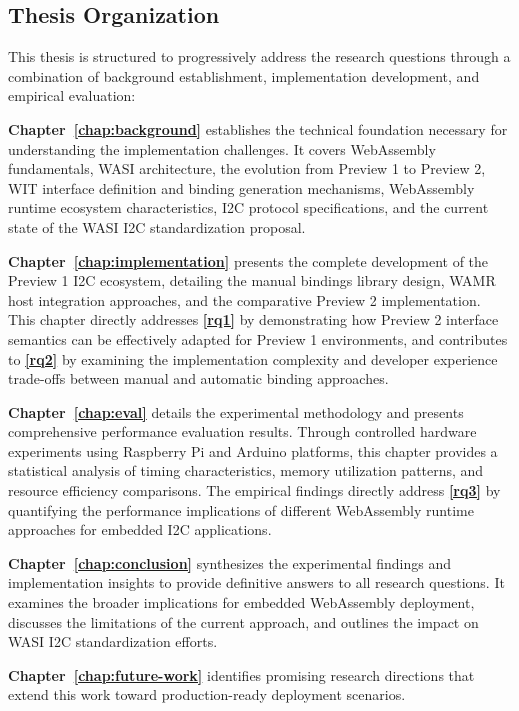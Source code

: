 \subsection{Thesis Organization}
\label{subsec:thesis-organization}

This thesis is structured to progressively address the research questions through a combination of background establishment, implementation development, and empirical evaluation:

\textbf{Chapter~\ref{chap:background}} establishes the technical foundation necessary for understanding the implementation challenges. It covers WebAssembly fundamentals, WASI architecture, the evolution from Preview 1 to Preview 2, WIT interface definition and binding generation mechanisms, WebAssembly runtime ecosystem characteristics, I2C protocol specifications, and the current state of the WASI I2C standardization proposal.

\textbf{Chapter~\ref{chap:implementation}} presents the complete development of the Preview 1 I2C ecosystem, detailing the manual bindings library design, WAMR host integration approaches, and the comparative Preview 2 implementation. This chapter directly addresses \textbf{\autoref{rq1}} by demonstrating how Preview 2 interface semantics can be effectively adapted for Preview 1 environments, and contributes to \textbf{\autoref{rq2}} by examining the implementation complexity and developer experience trade-offs between manual and automatic binding approaches.

\textbf{Chapter~\ref{chap:eval}} details the experimental methodology and presents comprehensive performance evaluation results. Through controlled hardware experiments using Raspberry Pi and Arduino platforms, this chapter provides a statistical analysis of timing characteristics, memory utilization patterns, and resource efficiency comparisons. The empirical findings directly address \textbf{\autoref{rq3}} by quantifying the performance implications of different WebAssembly runtime approaches for embedded I2C applications.

\textbf{Chapter~\ref{chap:conclusion}} synthesizes the experimental findings and implementation insights to provide definitive answers to all research questions. It examines the broader implications for embedded WebAssembly deployment, discusses the limitations of the current approach, and outlines the impact on WASI I2C standardization efforts.

\textbf{Chapter~\ref{chap:future-work}} identifies promising research directions that extend this work toward production-ready deployment scenarios.

